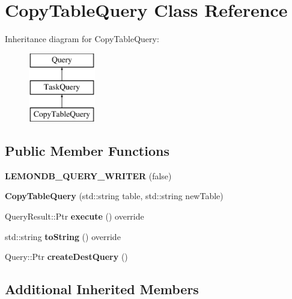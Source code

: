 \hypertarget{class_copy_table_query}{}\section{Copy\+Table\+Query Class Reference}
\label{class_copy_table_query}
Inheritance diagram for Copy\+Table\+Query\+:\begin{figure}[H]
\begin{center}
\leavevmode
\includegraphics[height=3.000000cm]{class_copy_table_query}
\end{center}
\end{figure}
\subsection*{Public Member Functions}
\begin{DoxyCompactItemize}
\item 
\mbox{\label{class_copy_table_query_adb7ceaaa450b6a126680cc2f87028233}} 
{\bfseries L\+E\+M\+O\+N\+D\+B\+\_\+\+Q\+U\+E\+R\+Y\+\_\+\+W\+R\+I\+T\+ER} (false)
\item 
\mbox{\label{class_copy_table_query_a79430091766721db1b8c706f76582b73}} 
{\bfseries Copy\+Table\+Query} (std\+::string table, std\+::string new\+Table)
\item 
\mbox{\label{class_copy_table_query_a8d360d5ba13351124ed9a6114c20fb10}} 
Query\+Result\+::\+Ptr {\bfseries execute} () override
\item 
\mbox{\label{class_copy_table_query_ae6b92734e8e8121e4360073bc7d8a54a}} 
std\+::string {\bfseries to\+String} () override
\item 
\mbox{\label{class_copy_table_query_a9291c277d7cfb790849551a7a7cc0ccc}} 
Query\+::\+Ptr {\bfseries create\+Dest\+Query} ()
\end{DoxyCompactItemize}
\subsection*{Additional Inherited Members}


